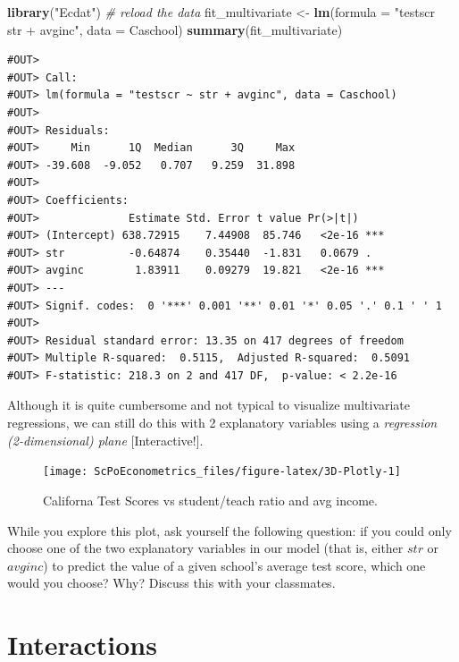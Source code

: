 \documentclass[]{book}
\newenvironment{Shaded}{\begin{snugshade}}{\end{snugshade}}
\newcommand{\KeywordTok}[1]{\textcolor[rgb]{0.13,0.29,0.53}{\textbf{#1}}}
\newcommand{\DataTypeTok}[1]{\textcolor[rgb]{0.13,0.29,0.53}{#1}}
\newcommand{\StringTok}[1]{\textcolor[rgb]{0.31,0.60,0.02}{#1}}
\newcommand{\CommentTok}[1]{\textcolor[rgb]{0.56,0.35,0.01}{\textit{#1}}}
\newcommand{\NormalTok}[1]{#1}
\theoremstyle{definition}
\theoremstyle{definition}
\theoremstyle{definition}
\theoremstyle{remark}
\begin{document}
\begin{Shaded}
\begin{Highlighting}[]
\KeywordTok{library}\NormalTok{(}\StringTok{"Ecdat"}\NormalTok{) }\CommentTok{# reload the data}
\NormalTok{fit_multivariate <-}\StringTok{ }\KeywordTok{lm}\NormalTok{(}\DataTypeTok{formula =} \StringTok{"testscr ~ str + avginc"}\NormalTok{, }\DataTypeTok{data =}\NormalTok{ Caschool)}
\KeywordTok{summary}\NormalTok{(fit_multivariate)}
\end{Highlighting}
\end{Shaded}

\begin{verbatim}
#OUT> 
#OUT> Call:
#OUT> lm(formula = "testscr ~ str + avginc", data = Caschool)
#OUT> 
#OUT> Residuals:
#OUT>     Min      1Q  Median      3Q     Max 
#OUT> -39.608  -9.052   0.707   9.259  31.898 
#OUT> 
#OUT> Coefficients:
#OUT>              Estimate Std. Error t value Pr(>|t|)    
#OUT> (Intercept) 638.72915    7.44908  85.746   <2e-16 ***
#OUT> str          -0.64874    0.35440  -1.831   0.0679 .  
#OUT> avginc        1.83911    0.09279  19.821   <2e-16 ***
#OUT> ---
#OUT> Signif. codes:  0 '***' 0.001 '**' 0.01 '*' 0.05 '.' 0.1 ' ' 1
#OUT> 
#OUT> Residual standard error: 13.35 on 417 degrees of freedom
#OUT> Multiple R-squared:  0.5115,  Adjusted R-squared:  0.5091 
#OUT> F-statistic: 218.3 on 2 and 417 DF,  p-value: < 2.2e-16
\end{verbatim}

Although it is quite cumbersome and not typical to visualize
multivariate regressions, we can still do this with 2 explanatory
variables using a \emph{regression (2-dimensional) plane}
{[}Interactive!{]}.

\begin{figure}

{\centering \texttt{[image: ScPoEconometrics\_files/figure-latex/3D-Plotly-1]} 

}

\caption{Californa Test Scores vs student/teach ratio and avg income.}\label{fig:3D-Plotly}
\end{figure}

While you explore this plot, ask yourself the following question: if you
could only choose one of the two explanatory variables in our model
(that is, either \(str\) or \(avginc\)) to predict the value of a given
school's average test score, which one would you choose? Why? Discuss
this with your classmates.

\section{Interactions}\label{mreg-interactions}
\end{document}
